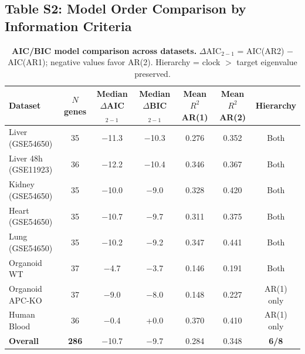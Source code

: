 \documentclass[11pt,letterpaper]{article}
\begin{document}
\subsection*{Table S2: Model Order Comparison by Information Criteria}

\begin{table}[H]
\centering
\caption{\textbf{AIC/BIC model comparison across datasets.} $\Delta$AIC$_{2-1}$ = AIC(AR2) $-$ AIC(AR1); negative values favor AR(2). Hierarchy = clock $>$ target eigenvalue preserved.}
\label{tab:aic_comparison}
\begin{tabular}{lcccccc}
\toprule
\textbf{Dataset} & \textbf{$N$ genes} & \textbf{Median $\Delta$AIC$_{2-1}$} & \textbf{Median $\Delta$BIC$_{2-1}$} & \textbf{Mean $R^2$ AR(1)} & \textbf{Mean $R^2$ AR(2)} & \textbf{Hierarchy} \\
\midrule
Liver (GSE54650) & 35 & $-$11.3 & $-$10.3 & 0.276 & 0.352 & Both \\
Liver 48h (GSE11923) & 36 & $-$12.2 & $-$10.4 & 0.346 & 0.367 & Both \\
Kidney (GSE54650) & 35 & $-$10.0 & $-$9.0 & 0.328 & 0.420 & Both \\
Heart (GSE54650) & 35 & $-$10.7 & $-$9.7 & 0.311 & 0.375 & Both \\
Lung (GSE54650) & 35 & $-$10.2 & $-$9.2 & 0.347 & 0.441 & Both \\
Organoid WT & 37 & $-$4.7 & $-$3.7 & 0.146 & 0.191 & Both \\
Organoid APC-KO & 37 & $-$9.0 & $-$8.0 & 0.148 & 0.227 & AR(1) only \\
Human Blood & 36 & $-$0.4 & +0.0 & 0.370 & 0.410 & AR(1) only \\
\midrule
\textbf{Overall} & \textbf{286} & $-$10.7 & $-$9.7 & 0.284 & 0.348 & \textbf{6/8} \\
\bottomrule
\end{tabular}
\end{table}
\end{document}
